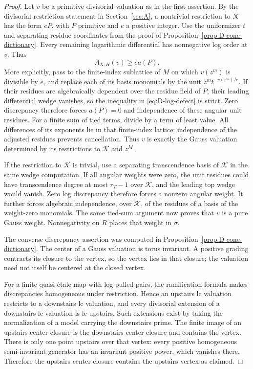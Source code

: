\begin{proof}
Let $v$ be a primitive divisorial valuation as in the first assertion.
By the divisorial restriction statement in Section~\ref{sec:A}, a
nontrivial restriction to $\mathcal K$ has the form $eP$, with $P$
primitive and $e$ a positive integer.  Use the uniformizer $t$ and
separating residue coordinates from the proof of
Proposition~\ref{prop:D-cone-dictionary}.  Every remaining logarithmic
differential has nonnegative log order at $v$.  Thus
\begin{equation}\label{eq:D-log-defect}
 A_{X,H}(v)\ge e a(P).
\end{equation}
More explicitly, pass to the finite-index sublattice of $M$ on which
$v(z^m)$ is divisible by $e$, and replace each of its basis monomials
by the unit $z^m t^{-v(z^m)/e}$.  If their residues are algebraically
dependent over the residue field of $P$, their leading differential
wedge vanishes, so the inequality in \eqref{eq:D-log-defect} is strict.
Zero discrepancy therefore forces $a(P)=0$ and independence of these
angular unit residues.  For a finite sum of tied terms, divide by a
term of least value.  All differences of its exponents lie in that
finite-index lattice; independence of the adjusted residues prevents
cancellation.  Thus $v$ is exactly the Gauss valuation determined by
its restrictions to $\mathcal K$ and $z^M$.

If the restriction to $\mathcal K$ is trivial, use a separating
transcendence basis of $\mathcal K$ in the same wedge computation.
If all angular weights were zero, the unit residues could have
transcendence degree at most $r_T-1$ over $\mathcal K$, and the leading
top wedge would vanish.  Zero log discrepancy therefore forces a
nonzero angular weight.  It further forces algebraic independence,
over $\mathcal K$, of the residues of a basis of the weight-zero
monomials.  The same tied-sum argument now proves that $v$ is a pure
Gauss weight.  Nonnegativity on $R$ places that weight in $\sigma$.

The converse discrepancy assertion was computed in
Proposition~\ref{prop:D-cone-dictionary}.  The center of a Gauss
valuation is torus invariant.  A positive grading contracts its
closure to the vertex, so the vertex lies in that closure; the
valuation need not itself be centered at the closed vertex.

For a finite quasi-\'{e}tale map with log-pulled pairs, the ramification
formula makes discrepancies homogeneous under restriction.  Hence
an upstairs lc valuation restricts to a downstairs lc valuation,
and every divisorial extension of a downstairs lc valuation is lc
upstairs.  Such extensions exist by taking the normalization of a
model carrying the downstairs prime.  The finite image of an upstairs
center closure is the downstairs center closure and contains the
vertex.  There is only one point upstairs over that vertex: every
positive homogeneous semi-invariant generator has an invariant
positive power, which vanishes there.  Therefore the upstairs center
closure contains the upstairs vertex as claimed.
\end{proof}

